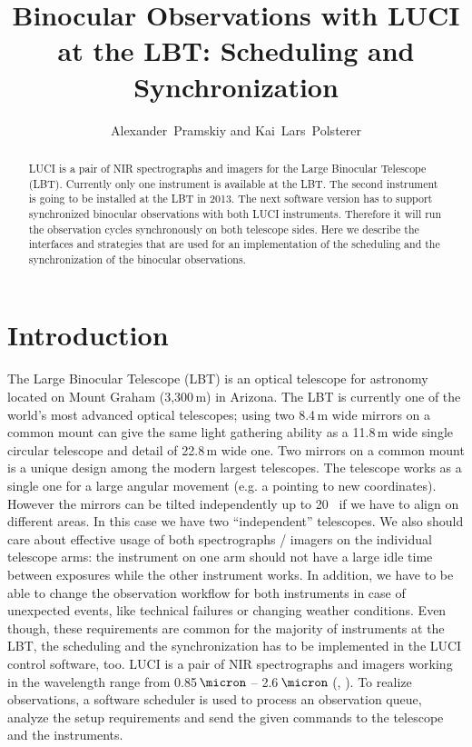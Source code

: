 
\resetcounters




\title{Binocular Observations with LUCI at the LBT: Scheduling and Synchronization}
\author{Alexander~Pramskiy and Kai~Lars~Polsterer
}


\begin{abstract}
LUCI is a pair of NIR spectrographs and imagers for the Large Binocular Telescope (LBT).
Currently only one instrument is available at the LBT. 
The second instrument is going to be installed at the LBT in 2013. The next software version has to support synchronized
binocular observations with both LUCI instruments.
Therefore it will run the observation cycles synchronously on both telescope sides.
Here we describe the interfaces and strategies that are used for an implementation of the scheduling and the synchronization of the binocular observations. 

\end{abstract}

\section{Introduction}

The Large Binocular Telescope (LBT) is an optical telescope for astronomy located on Mount Graham (3,300\,m) in 
Arizona.
The LBT is currently one of the world's most advanced optical telescopes; using two 8.4\,m wide mirrors on 
a common mount can give the same light gathering ability as a 11.8\,m wide single circular telescope and 
detail of 22.8\,m wide one. Two mirrors on a common mount is a unique design among the 
modern largest telescopes. The telescope works as a single one for a large angular movement 
(e.g. a pointing to new coordinates). However the mirrors can be tilted independently up to 20\arcsec~ if we have to 
align on different areas. In this case we have two ``independent'' 
telescopes. We also should care about effective usage of both spectrographs / imagers on the individual telescope arms: 
the instrument on one arm should not have a large idle time between exposures while the other instrument works.
In addition, we have to be able to change the observation workflow for both instruments in case of unexpected events, like technical failures or changing weather conditions.
Even though, these requirements are common for the majority of instruments at the LBT, the
scheduling and the synchronization has to be implemented in the LUCI control software, too. 
LUCI is a pair of NIR spectrographs and imagers working in the wavelength range
from 0.85\,$\micron$ -- 2.6\,$\micron$ (\cite{2003SPIE.4841..962S}, \cite{polsterer:2011}). To realize observations, 
a software scheduler is used to process an observation queue, analyze the setup requirements and send the given commands to the telescope and the instruments. 

